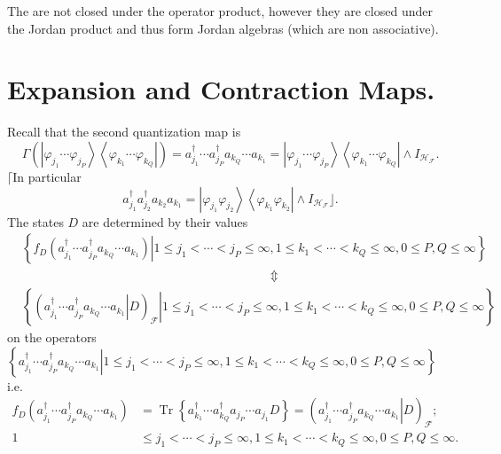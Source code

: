 \documentclass[aps,preprint]{revtex4}%
\begin{document}
The are not closed under the operator product, however they are closed under
the Jordan product and thus form Jordan algebras (which are non associative).

\section{Expansion and Contraction Maps.}

Recall that the second quantization map is
\begin{equation}
\Gamma\left(  \left\vert \varphi_{j_{1}}\cdots\varphi_{j_{P}}\right\rangle
\left\langle \varphi_{k_{1}}\cdots\varphi_{k_{Q}}\right\vert \right)
=a_{j_{1}}^{\dagger}\cdots a_{j_{P}}^{\dagger}a_{k_{Q}}\cdots a_{k_{1}%
}=\left\vert \varphi_{j_{1}}\cdots\varphi_{j_{P}}\right\rangle \left\langle
\varphi_{k_{1}}\cdots\varphi_{k_{Q}}\right\vert \wedge I_{\mathcal{H}%
_{\mathcal{F}}}.
\end{equation}
$\lceil$In particular%
\[
a_{j_{1}}^{\dagger}a_{j_{2}}^{\dagger}a_{k_{2}}a_{k_{1}}=\left\vert
\varphi_{j_{1}}\varphi_{j_{2}}\right\rangle \left\langle \varphi_{k_{1}%
}\varphi_{k_{2}}\right\vert \wedge I_{\mathcal{H}_{\mathcal{F}}}\rfloor.
\]
The states $D$ are determined by their values
\begin{align}
&  \left\{  \left.  f_{D}\left(  a_{j_{1}}^{\dagger}\cdots a_{j_{P}}^{\dagger
}a_{k_{Q}}\cdots a_{k_{1}}\right)  \right\vert 1\leq j_{1}<\cdots<j_{P}%
\leq\infty,1\leq k_{1}<\cdots<k_{Q}\leq\infty,0\leq P,Q\leq\infty\right\}
\nonumber\\
&  \qquad\qquad\qquad\qquad\qquad\qquad\qquad\qquad\qquad\qquad\left.
\Updownarrow\right. \nonumber\\
&  \left\{  \left.  \left(  \left.  a_{j_{1}}^{\dagger}\cdots a_{j_{P}%
}^{\dagger}a_{k_{Q}}\cdots a_{k_{1}}\right\vert D\right)  _{\mathcal{F}%
}\right\vert 1\leq j_{1}<\cdots<j_{P}\leq\infty,1\leq k_{1}<\cdots<k_{Q}%
\leq\infty,0\leq P,Q\leq\infty\right\}
\end{align}
on the operators $\left\{  \left.  a_{j_{1}}^{\dagger}\cdots a_{j_{P}%
}^{\dagger}a_{k_{Q}}\cdots a_{k_{1}}\right\vert 1\leq j_{1}<\cdots<j_{P}%
\leq\infty,1\leq k_{1}<\cdots<k_{Q}\leq\infty,0\leq P,Q\leq\infty\right\}  $
i.e.
\begin{align}
f_{D}\left(  a_{j_{1}}^{\dagger}\cdots a_{j_{P}}^{\dagger}a_{k_{Q}}\cdots
a_{k_{1}}\right)   &  =\operatorname{Tr}\left\{  a_{k_{1}}^{\dagger}\cdots
a_{k_{Q}}^{\dagger}a_{j_{P}}\cdots a_{j_{1}}D\right\}  =\left(  \left.
a_{j_{1}}^{\dagger}\cdots a_{j_{P}}^{\dagger}a_{k_{Q}}\cdots a_{k_{1}%
}\right\vert D\right)  _{\mathcal{F}};\nonumber\\
1  &  \leq j_{1}<\cdots<j_{P}\leq\infty,1\leq k_{1}<\cdots<k_{Q}\leq
\infty,0\leq P,Q\leq\infty.
\end{align}
\end{document}
